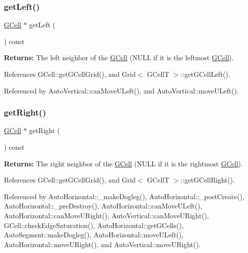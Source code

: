 \subsubsection{\texorpdfstring{get\+Left()}{getLeft()}}
{\footnotesize\ttfamily \mbox{\hyperlink{classKatabatic_1_1GCell}{G\+Cell}} $\ast$ get\+Left (\begin{DoxyParamCaption}{ }\end{DoxyParamCaption}) const}

{\bfseries Returns\+:} The left neighbor of the \mbox{\hyperlink{classKatabatic_1_1GCell}{G\+Cell}} ({\ttfamily N\+U\+LL} if it is the leftmost \mbox{\hyperlink{classKatabatic_1_1GCell}{G\+Cell}}). 

References G\+Cell\+::get\+G\+Cell\+Grid(), and Grid$<$ G\+Cell\+T $>$\+::get\+G\+Cell\+Left().



Referenced by Auto\+Vertical\+::can\+Move\+U\+Left(), and Auto\+Vertical\+::move\+U\+Left().

\mbox{\label{classKatabatic_1_1GCell_abdeb6b4a351f8b292894d3f0c24f105d}} 
\subsubsection{\texorpdfstring{get\+Right()}{getRight()}}
{\footnotesize\ttfamily \mbox{\hyperlink{classKatabatic_1_1GCell}{G\+Cell}} $\ast$ get\+Right (\begin{DoxyParamCaption}{ }\end{DoxyParamCaption}) const}

{\bfseries Returns\+:} The right neighbor of the \mbox{\hyperlink{classKatabatic_1_1GCell}{G\+Cell}} ({\ttfamily N\+U\+LL} if it is the rightmost \mbox{\hyperlink{classKatabatic_1_1GCell}{G\+Cell}}). 

References G\+Cell\+::get\+G\+Cell\+Grid(), and Grid$<$ G\+Cell\+T $>$\+::get\+G\+Cell\+Right().



Referenced by Auto\+Horizontal\+::\+\_\+make\+Dogleg(), Auto\+Horizontal\+::\+\_\+post\+Create(), Auto\+Horizontal\+::\+\_\+pre\+Destroy(), Auto\+Horizontal\+::can\+Move\+U\+Left(), Auto\+Horizontal\+::can\+Move\+U\+Right(), Auto\+Vertical\+::can\+Move\+U\+Right(), G\+Cell\+::check\+Edge\+Saturation(), Auto\+Horizontal\+::get\+G\+Cells(), Auto\+Segment\+::make\+Dogleg(), Auto\+Horizontal\+::move\+U\+Left(), Auto\+Horizontal\+::move\+U\+Right(), and Auto\+Vertical\+::move\+U\+Right().

